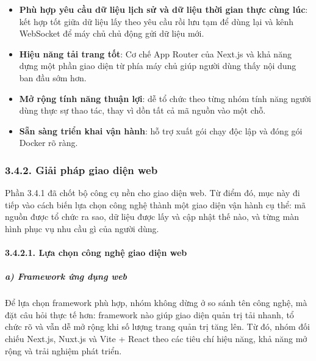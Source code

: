 \documentclass[a4paper]{extarticle}
\providecommand{\tightlist}{%
  \setlength{\itemsep}{0pt}\setlength{\parskip}{0pt}}
\begin{document}
\begin{itemize}
\tightlist
\item
  \textbf{Phù hợp yêu cầu dữ liệu lịch sử và dữ liệu thời gian thực cùng
  lúc}: kết hợp tốt giữa dữ liệu lấy theo yêu cầu rồi lưu tạm để dùng
  lại và kênh WebSocket để máy chủ chủ động gửi dữ liệu mới.
\item
  \textbf{Hiệu năng tải trang tốt}: Cơ chế App Router của Next.js và khả
  năng dựng một phần giao diện từ phía máy chủ giúp người dùng thấy nội
  dung ban đầu sớm hơn.
\item
  \textbf{Mở rộng tính năng thuận lợi}: dễ tổ chức theo từng nhóm tính năng
  người dùng thực sự thao tác, thay vì dồn tất cả mã nguồn vào một chỗ.
\item
  \textbf{Sẵn sàng triển khai vận hành}: hỗ trợ xuất gói chạy độc lập và
  đóng gói Docker rõ ràng.
\end{itemize}

\subsubsection{3.4.2. Giải pháp giao diện
web}\label{324-giux1ea3i-phuxe1p-frontend}

Phần 3.4.1 đã chốt bộ công cụ nền cho giao diện web. Từ điểm đó, mục
này đi tiếp vào cách biến lựa chọn công nghệ thành một giao diện vận
hành cụ thể: mã nguồn được tổ chức ra sao, dữ liệu được lấy và cập nhật
thế nào, và từng màn hình phục vụ nhu cầu gì của người dùng.

\paragraph{3.4.2.1. Lựa chọn công nghệ giao diện web}\label{3241-lux1ef1a-chux1ecdn-cuxf4ng-nghux1ec7-frontend-technology-selection}

\subparagraph{a) Framework ứng dụng
web}\label{a-framework-ux1ee9ng-dux1ee5ng-web}

Để lựa chọn framework phù hợp, nhóm không dừng ở so sánh tên công nghệ,
mà đặt câu hỏi thực tế hơn: framework nào giúp giao diện quản trị tải nhanh, tổ
chức rõ và vẫn dễ mở rộng khi số lượng trang quản trị tăng lên. Từ đó,
nhóm đối chiếu Next.js, Nuxt.js và Vite + React theo các tiêu chí hiệu
năng, khả năng mở rộng và trải nghiệm phát triển.
\end{document}
